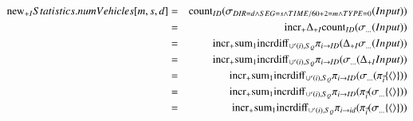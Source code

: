 \begin{eqnarray*}
\mathrm{new}_{+I} Statistics.numVehicles[m, s, d] &=& \mbox{count}_{ID} (\sigma_{ DIR = d \wedge SEG = s \wedge TIME/60 + 2 = m \wedge TYPE = 0 }(Input) )\\
&=& \mathrm{incr}_{+} \Delta_{+I} \mbox{count}_{ID} (\sigma_{\dots} (Input))\\
&=& \mathrm{incr}_{+} \mathrm{sum}_{1} \mathrm{incrdiff}_{\cup'(i), S_Q} \pi_{i \rightarrow ID} (\Delta_{+I} \sigma_{\dots} (Input))\\
&=& \mathrm{incr}_{+} \mathrm{sum}_{1} \mathrm{incrdiff}_{\cup'(i), S_Q} \pi_{i \rightarrow ID} (\sigma_{\dots} (\Delta_{+I} Input))\\
&=& \mathrm{incr}_{+} \mathrm{sum}_{1} \mathrm{incrdiff}_{\cup'(i), S_Q} \pi_{i \rightarrow ID} (\sigma_{\dots} (\pi_{\vec{i}} \{{\langle\rangle}\}))\\
&=& \mathrm{incr}_{+} \mathrm{sum}_{1} \mathrm{incrdiff}_{\cup'(i), S_Q} \pi_{i \rightarrow ID} (\pi_{\vec{i}} (\sigma_{\dots} \{{\langle\rangle}\}))\\
&=& \mathrm{incr}_{+} \mathrm{sum}_{1} \mathrm{incrdiff}_{\cup'(i), S_Q} \pi_{i \rightarrow id} (\pi_{\vec{i}} (\sigma_{\dots} \{{\langle\rangle}\}))
\end{eqnarray*}
\pagebreak

